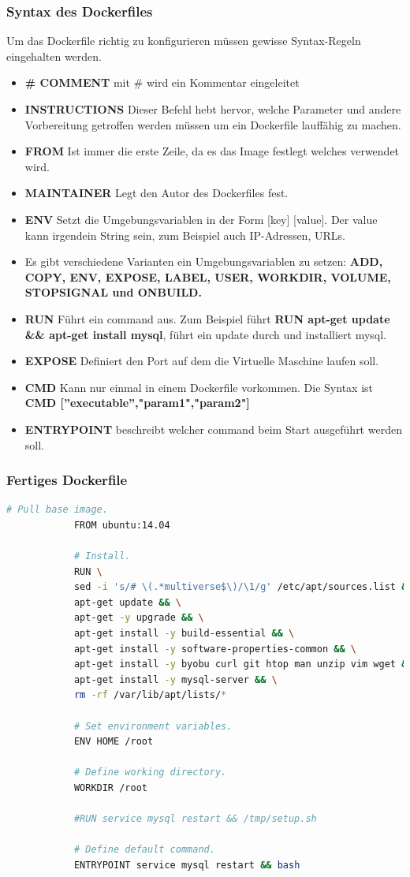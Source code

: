 		\subsubsection{Syntax des Dockerfiles}
			Um das Dockerfile richtig zu konfigurieren müssen gewisse Syntax-Regeln eingehalten werden.
			\begin{itemize}
				\item \textbf{\# COMMENT} mit \# wird ein Kommentar eingeleitet
				\item \textbf{INSTRUCTIONS} Dieser Befehl hebt hervor, welche 	Parameter und andere Vorbereitung getroffen werden müssen um ein Dockerfile lauffähig zu machen.
				\item \textbf{FROM} Ist immer die erste Zeile, da es das Image festlegt welches verwendet wird.
				\item \textbf{MAINTAINER} Legt den Autor des Dockerfiles fest.
				\item \textbf{ENV} Setzt die Umgebungsvariablen in der Form [key] [value]. Der value kann irgendein String sein, zum Beispiel auch IP-Adressen, URLs.
				\item Es gibt verschiedene Varianten ein Umgebungsvariablen zu setzen: \textbf{ADD, COPY, ENV, EXPOSE, LABEL, USER, WORKDIR, VOLUME, STOPSIGNAL und ONBUILD.}
				\item \textbf{RUN} Führt ein command aus. Zum Beispiel führt \textbf{RUN apt-get update \&\& apt-get install mysql}, führt ein update durch und installiert mysql.
				\item \textbf{EXPOSE} Definiert den Port auf dem die Virtuelle Maschine laufen soll.
				\item \textbf{CMD} Kann nur einmal in einem Dockerfile vorkommen. Die Syntax ist \textbf{CMD [''executable'',"param1","param2"]}
				\item \textbf{ENTRYPOINT} beschreibt welcher command beim Start ausgeführt werden soll.
			\end{itemize}
		\subsubsection{Fertiges Dockerfile}
		
			\begin{lstlisting}[language=bash,caption={Dockerfile des selbsterstellten Images}]
			# Pull base image.
			FROM ubuntu:14.04
			
			# Install.
			RUN \
			sed -i 's/# \(.*multiverse$\)/\1/g' /etc/apt/sources.list && \
			apt-get update && \
			apt-get -y upgrade && \
			apt-get install -y build-essential && \
			apt-get install -y software-properties-common && \
			apt-get install -y byobu curl git htop man unzip vim wget && \
			apt-get install -y mysql-server && \
			rm -rf /var/lib/apt/lists/*
			
			# Set environment variables.
			ENV HOME /root
			
			# Define working directory.
			WORKDIR /root
			
			#RUN service mysql restart && /tmp/setup.sh
			
			# Define default command.
			ENTRYPOINT service mysql restart && bash
			\end{lstlisting}
		
